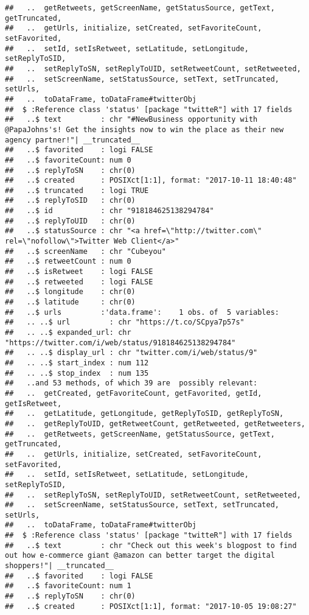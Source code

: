 \documentclass[]{article}
\begin{document}
\begin{verbatim}
##   ..  getRetweets, getScreenName, getStatusSource, getText, getTruncated,
##   ..  getUrls, initialize, setCreated, setFavoriteCount, setFavorited,
##   ..  setId, setIsRetweet, setLatitude, setLongitude, setReplyToSID,
##   ..  setReplyToSN, setReplyToUID, setRetweetCount, setRetweeted,
##   ..  setScreenName, setStatusSource, setText, setTruncated, setUrls,
##   ..  toDataFrame, toDataFrame#twitterObj
##  $ :Reference class 'status' [package "twitteR"] with 17 fields
##   ..$ text         : chr "#NewBusiness opportunity with @PapaJohns's! Get the insights now to win the place as their new agency partner!"| __truncated__
##   ..$ favorited    : logi FALSE
##   ..$ favoriteCount: num 0
##   ..$ replyToSN    : chr(0) 
##   ..$ created      : POSIXct[1:1], format: "2017-10-11 18:40:48"
##   ..$ truncated    : logi TRUE
##   ..$ replyToSID   : chr(0) 
##   ..$ id           : chr "918184625138294784"
##   ..$ replyToUID   : chr(0) 
##   ..$ statusSource : chr "<a href=\"http://twitter.com\" rel=\"nofollow\">Twitter Web Client</a>"
##   ..$ screenName   : chr "Cubeyou"
##   ..$ retweetCount : num 0
##   ..$ isRetweet    : logi FALSE
##   ..$ retweeted    : logi FALSE
##   ..$ longitude    : chr(0) 
##   ..$ latitude     : chr(0) 
##   ..$ urls         :'data.frame':    1 obs. of  5 variables:
##   .. ..$ url         : chr "https://t.co/SCpya7p57s"
##   .. ..$ expanded_url: chr "https://twitter.com/i/web/status/918184625138294784"
##   .. ..$ display_url : chr "twitter.com/i/web/status/9"
##   .. ..$ start_index : num 112
##   .. ..$ stop_index  : num 135
##   ..and 53 methods, of which 39 are  possibly relevant:
##   ..  getCreated, getFavoriteCount, getFavorited, getId, getIsRetweet,
##   ..  getLatitude, getLongitude, getReplyToSID, getReplyToSN,
##   ..  getReplyToUID, getRetweetCount, getRetweeted, getRetweeters,
##   ..  getRetweets, getScreenName, getStatusSource, getText, getTruncated,
##   ..  getUrls, initialize, setCreated, setFavoriteCount, setFavorited,
##   ..  setId, setIsRetweet, setLatitude, setLongitude, setReplyToSID,
##   ..  setReplyToSN, setReplyToUID, setRetweetCount, setRetweeted,
##   ..  setScreenName, setStatusSource, setText, setTruncated, setUrls,
##   ..  toDataFrame, toDataFrame#twitterObj
##  $ :Reference class 'status' [package "twitteR"] with 17 fields
##   ..$ text         : chr "Check out this week's blogpost to find out how e-commerce giant @amazon can better target the digital shoppers!"| __truncated__
##   ..$ favorited    : logi FALSE
##   ..$ favoriteCount: num 1
##   ..$ replyToSN    : chr(0) 
##   ..$ created      : POSIXct[1:1], format: "2017-10-05 19:08:27"

\end{verbatim}
\end{document}
